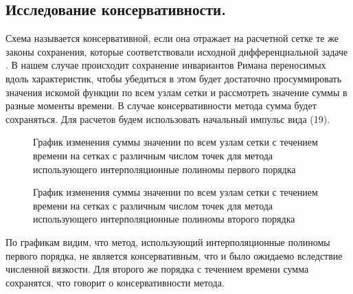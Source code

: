 \documentclass[14pt]{article}
\begin{document}
\subsection{Исследование консервативности.}
Схема называется консервативной, если она отражает на  расчетной сетке те же законы сохранения, которые соответствовали исходной дифференциальной задаче \cite{21}. В нашем случае происходит сохранение инвариантов Римана переносимых вдоль характеристик, чтобы убедиться в этом будет достаточно просуммировать значения искомой функции по всем узлам сетки и рассмотреть значение суммы в разные моменты времени. В случае консервативности метода сумма будет сохраняться. Для расчетов будем использовать начальный импульс вида (19).
\begin{figure}[H]
\caption{График изменения суммы значении по всем узлам сетки с течением времени на сетках с различным числом точек для метода использующего интерполяционные полиномы первого порядка}
\end{figure}
\begin{figure}[H]
\caption{График изменения суммы значении по всем узлам сетки с течением времени на сетках с различным числом точек для метода использующего интерполяционные полиномы второго порядка}
\end{figure}
По графикам видим, что метод, использующий интерполяционные полиномы первого порядка, не является консервативным, что и было ожидаемо вследствие численной вязкости. Для второго же порядка с течением времени сумма сохранятся, что говорит о консервативности метода.
\end{document}
